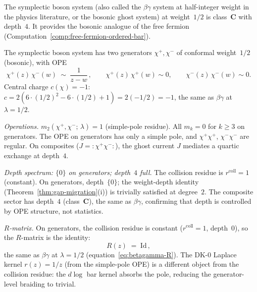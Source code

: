 The symplectic boson system (also called the $\beta\gamma$
system at half-integer weight in the physics literature,
or the bosonic ghost system) at weight~$1/2$ is
class~$\mathbf{C}$ with depth~$4$. It provides the
bosonic analogue of the free fermion
(Computation~\ref{comp:free-fermion-ordered-bar}).

\begin{computation}%
\label{comp:symplectic-boson-ordered-bar}%
%
%
%
The symplectic boson system has two generators
$\chi^+, \chi^-$ of conformal weight~$1/2$ (bosonic),
with OPE
\begin{equation}\label{eq:symplectic-boson-ope}
\chi^+(z)\,\chi^-(w) \;\sim\; \frac{1}{z-w}\,,
\qquad
\chi^+(z)\,\chi^+(w) \sim 0,
\qquad
\chi^-(z)\,\chi^-(w) \sim 0.
\end{equation}
Central charge $c(\chi) = -1$:
$c = 2(6 \cdot (1/2)^2 - 6 \cdot (1/2) + 1) = 2(-1/2) = -1$,
the same as $\beta\gamma$ at $\lambda = 1/2$.

\smallskip
\noindent
\emph{Operations.}
$m_2(\chi^+, \chi^-;\,\lambda) = 1$ (simple-pole residue).
All $m_k = 0$ for $k \ge 3$ on generators. The OPE on
generators has only a simple pole, and $\chi^+\chi^+$,
$\chi^-\chi^-$ are regular. On composites
($J = {:}\chi^+\chi^-{:}$), the ghost current $J$ mediates
a quartic exchange at depth~$4$.

\smallskip
\noindent
\emph{Depth spectrum: $\{0\}$ on generators; depth~$4$ full.}
The collision residue is $r^{\mathrm{coll}} = 1$ (constant).
On generators, depth~$\{0\}$; the weight-depth identity (Theorem~\ref{thm:gap-migration}(i)) is trivially satisfied at degree~$2$. The composite sector has
depth~$4$ (class~$\mathbf{C}$), the same as
$\beta\gamma$, confirming that depth is controlled by
OPE structure, not statistics.

\smallskip
\noindent
\emph{$R$-matrix.}
On generators, the collision residue is constant
($r^{\mathrm{coll}} = 1$, depth~$0$), so the $R$-matrix is
the identity:
\begin{equation}\label{eq:symplectic-boson-R}
R(z) \;=\; \mathrm{Id}\,,
\end{equation}
the same as $\beta\gamma$ at $\lambda = 1/2$
(equation~\eqref{eq:betagamma-R}). The DK-0 Laplace
kernel $r(z) = 1/z$ (from the simple-pole OPE) is a
different object from the collision residue: the $d\log$
bar kernel absorbs the pole, reducing the generator-level
braiding to trivial.


\end{computation}

